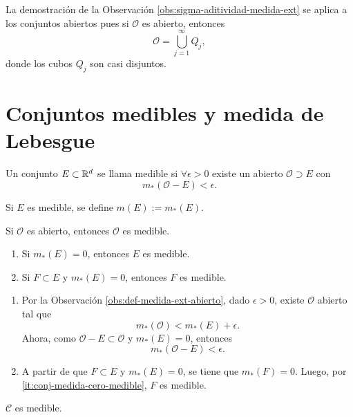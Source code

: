 La demostraci\'on de la Observaci\'on \ref{obs:sigma-aditividad-medida-ext} se aplica a los conjuntos abiertos pues si
$\mathcal{O}$ es abierto, entonces
\[
\mathcal{O}=\bigcup\limits_{j=1}^{\infty} Q_j,
\]
donde los cubos $Q_j$ son casi disjuntos.


\section{Conjuntos medibles y medida de Lebesgue}

\begin{definicion}{}
Un conjunto $E\subset \mathbb{R}^d$ se llama medible si $\forall \epsilon>0$ existe un abierto $\mathcal{O}\supset E$
con 
\[
m_{*}(\mathcal{O}-E)<\epsilon.
\]
\end{definicion}

Si $E$ es medible, se define $m(E):=m_{*}(E)$.

\begin{proposicion}{}
Si $\mathcal{O}$ es abierto, entonces $\mathcal{O}$ es medible.
\end{proposicion}

\begin{proposicion}{}
\begin{enumerate}
    \item\label{it:conj-medida-cero-medible} Si $m_{*}(E)=0$, entonces $E$ es medible. 
    \item Si $F\subset E$ y $m_{*}(E)=0$, entonces $F$ es medible.
\end{enumerate}
\end{proposicion}

\begin{demo}
\begin{enumerate}
    \item Por la Observaci\'on \ref{obs:def-medida-ext-abierto}, 
    dado $\epsilon>0$, existe $\mathcal{O}$ abierto tal que 
    \[
    m_{*}(\mathcal{O})<m_{*}(E)+\epsilon.
    \]
    Ahora, como $\mathcal{O}-E \subset \mathcal{O}$ y $m_{*}(E)=0$, entonces 
    \[
    m_{*}(\mathcal{O}-E)<\epsilon.
    \]

\item  A partir de que $F\subset E$ y $m_{*}(E)=0$, se tiene que $m_{*}(F)=0$. 
Luego, por \ref{it:conj-medida-cero-medible}, $F$ es medible.
\end{enumerate}
\end{demo}

\begin{observacion}{}
$\mathscr{C}$ es medible.
\end{observacion}

